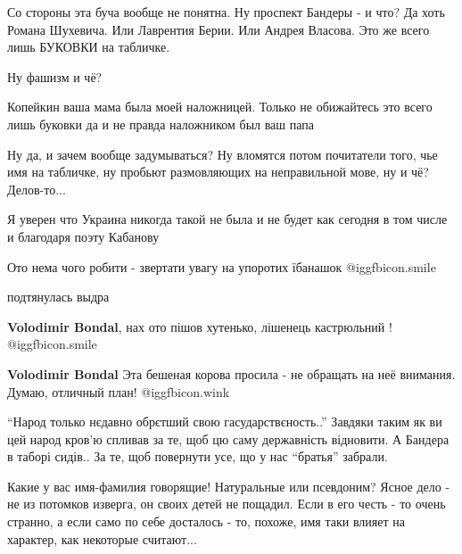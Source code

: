\begin{itemize}

\obeycr
Со стороны эта буча вообще не понятна.
Ну проспект Бандеры - и что?
Да хоть Романа Шухевича.
Или Лаврентия Берии.
Или Андрея Власова.
Это же всего лишь БУКОВКИ на табличке.
\restorecr

\begin{itemize} %
Ну фашизм и чё?

Копейкин ваша мама была моей наложницей. Только не обижайтесь это всего лишь буковки да и не правда наложником был ваш папа

Ну да, и зачем вообще задумываться?
Ну вломятся потом почитатели того, чье имя на табличке, ну пробьют размовляющих на неправильной мове, ну и чё?
Делов-то...
\end{itemize} %

Я уверен что Украина никогда такой не была и не будет как сегодня в том числе и благодаря поэту Кабанову


Ото нема чого робити - звертати увагу на упоротих їбанашок  @igg{fbicon.smile} 

\begin{itemize} %
подтянулась выдра


\textbf{Volodimir Bondal}, нах ото пішов хутенько, лішенець кастрюльний !  @igg{fbicon.smile} 

\textbf{Volodimir Bondal} Эта бешеная корова просила - не обращать на неё внимания. Думаю, отличный план!  @igg{fbicon.wink} 
\end{itemize} %


\enquote{Народ только нєдавно обрєтший свою гасударствєность..}
Завдяки таким як ви цей народ кров'ю спливав за те, щоб цю саму державність відновити.
А Бандера в таборі сидів..
За те, щоб повернути усе, що у нас \enquote{братья} забрали.

\begin{itemize} %

Какие у вас имя-фамилия говорящие! Натуральные или псевдоним? Ясное дело - не
из потомков изверга, он своих детей не пощадил. Если в его честь - то очень
странно, а если само по себе досталось - то, похоже, имя таки влияет на
характер, как некоторые считают...



\end{itemize}
\end{itemize}
